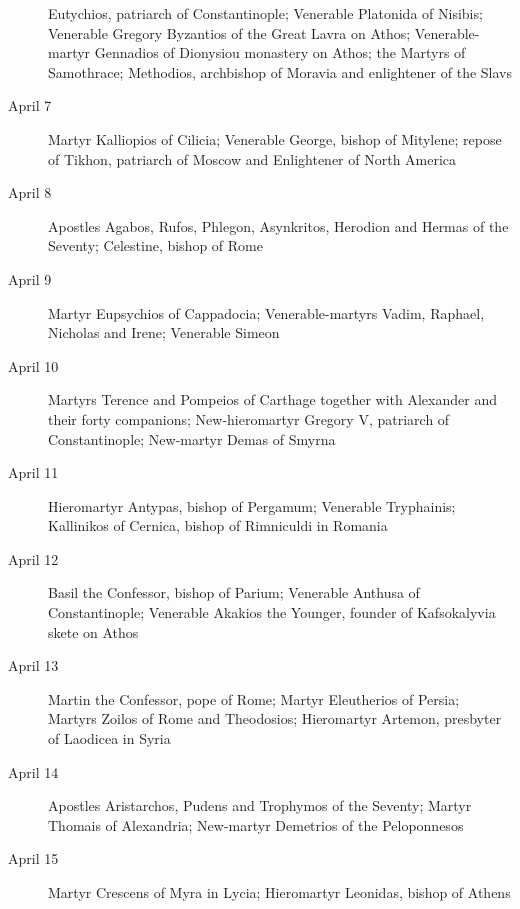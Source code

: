 \begin{description}
Eutychios, patriarch of Constantinople; Venerable Platonida of Nisibis; Venerable Gregory Byzantios of the Great Lavra on Athos; Venerable-martyr Gennadios of Dionysiou monastery on Athos; the Martyrs of Samothrace; Methodios, archbishop of Moravia and enlightener of the Slavs

\item[April 7]

Martyr Kalliopios of Cilicia; Venerable George, bishop of Mitylene; repose of Tikhon, patriarch of Moscow and Enlightener of North America

\item[April 8]

Apostles Agabos, Rufos, Phlegon, Asynkritos, Herodion and Hermas of the Seventy; Celestine, bishop of Rome

\item[April 9]

Martyr Eupsychios of Cappadocia; Venerable-martyrs Vadim, Raphael, Nicholas and Irene; Venerable Simeon

\item[April 10]

Martyrs Terence and Pompeios of Carthage together with Alexander and their forty companions; New-hieromartyr Gregory V, patriarch of Constantinople; New-martyr Demas of Smyrna

\item[April 11]

Hieromartyr Antypas, bishop of Pergamum; Venerable Tryphainis; Kallinikos of Cernica, bishop of Rimniculdi in Romania

\item[April 12]

Basil the Confessor, bishop of Parium; Venerable Anthusa of Constantinople; Venerable Akakios the Younger, founder of Kafsokalyvia skete on Athos

\item[April 13]

Martin the Confessor, pope of Rome; Martyr Eleutherios of Persia; Martyrs Zoilos of Rome and Theodosios; Hieromartyr Artemon, presbyter of Laodicea in Syria

\item[April 14]

Apostles Aristarchos, Pudens and Trophymos of the Seventy; Martyr Thomais of Alexandria; New-martyr Demetrios of the Peloponnesos

\item[April 15]

Martyr Crescens of Myra in Lycia; Hieromartyr Leonidas, bishop of Athens


\end{description}
